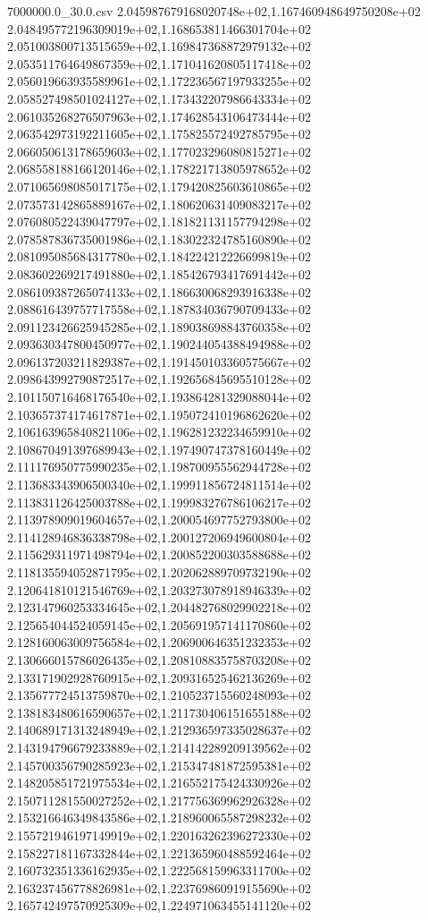\begin{filecontents*}{7000000.0_30.0.csv}
2.045987679168020748e+02,1.167460948649750208e+02
2.048495772196309019e+02,1.168653811466301704e+02
2.051003800713515659e+02,1.169847368872979132e+02
2.053511764649867359e+02,1.171041620805117418e+02
2.056019663935589961e+02,1.172236567197933255e+02
2.058527498501024127e+02,1.173432207986643334e+02
2.061035268276507963e+02,1.174628543106473444e+02
2.063542973192211605e+02,1.175825572492785795e+02
2.066050613178659603e+02,1.177023296080815271e+02
2.068558188166120146e+02,1.178221713805978652e+02
2.071065698085017175e+02,1.179420825603610865e+02
2.073573142865889167e+02,1.180620631409083217e+02
2.076080522439047797e+02,1.181821131157794298e+02
2.078587836735001986e+02,1.183022324785160890e+02
2.081095085684317780e+02,1.184224212226699819e+02
2.083602269217491880e+02,1.185426793417691442e+02
2.086109387265074133e+02,1.186630068293916338e+02
2.088616439757717558e+02,1.187834036790709433e+02
2.091123426625945285e+02,1.189038698843760358e+02
2.093630347800450977e+02,1.190244054388494988e+02
2.096137203211829387e+02,1.191450103360575667e+02
2.098643992790872517e+02,1.192656845695510128e+02
2.101150716468176540e+02,1.193864281329088044e+02
2.103657374174617871e+02,1.195072410196862620e+02
2.106163965840821106e+02,1.196281232234659910e+02
2.108670491397689943e+02,1.197490747378160449e+02
2.111176950775990235e+02,1.198700955562944728e+02
2.113683343906500340e+02,1.199911856724811514e+02
2.113831126425003788e+02,1.199983276786106217e+02
2.113978909019604657e+02,1.200054697752793800e+02
2.114128946836338798e+02,1.200127206949600804e+02
2.115629311971498794e+02,1.200852200303588688e+02
2.118135594052871795e+02,1.202062889709732190e+02
2.120641810121546769e+02,1.203273078918946339e+02
2.123147960253334645e+02,1.204482768029902218e+02
2.125654044524059145e+02,1.205691957141170860e+02
2.128160063009756584e+02,1.206900646351232353e+02
2.130666015786026435e+02,1.208108835758703208e+02
2.133171902928760915e+02,1.209316525462136269e+02
2.135677724513759870e+02,1.210523715560248093e+02
2.138183480616590657e+02,1.211730406151655188e+02
2.140689171313248949e+02,1.212936597335028637e+02
2.143194796679233889e+02,1.214142289209139562e+02
2.145700356790285923e+02,1.215347481872595381e+02
2.148205851721975534e+02,1.216552175424330926e+02
2.150711281550027252e+02,1.217756369962926328e+02
2.153216646349843586e+02,1.218960065587298232e+02
2.155721946197149919e+02,1.220163262396272330e+02
2.158227181167332844e+02,1.221365960488592464e+02
2.160732351336162935e+02,1.222568159963311700e+02
2.163237456778826981e+02,1.223769860919155690e+02
2.165742497570925309e+02,1.224971063455141120e+02

\end{filecontents*}
